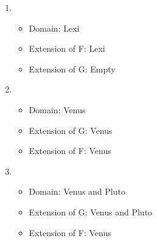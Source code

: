 \begin{enumerate}
\begin{enumerate}
	\item {}

	 \opts{

	  \dotline
	  \dotline
	  \dotline
	  \dotline
	  \dotline

	 }
	 {

	\begin{itemize}

	 \item Domain: Lexi

	 \item Extension of F: Lexi

	 \item Extension of G: Empty

	\end{itemize}

	 }



	\item {}

	 \opts{

	  \dotline
	  \dotline
	  \dotline
	  \dotline
	  \dotline

	 }
	 {

	  \begin{itemize}

	   \item Domain: Venus

	   \item Extension of G: Venus

	   \item Extension of F: Venus

   \end{itemize}

  }



	\item {}

	 \opts{

	  \dotline
	  \dotline
	  \dotline
	  \dotline
	  \dotline

	 }
	 {
	  \begin{itemize}

	   \item Domain: Venus and Pluto

	  \item Extension of G: Venus and Pluto

	 \item Extension of F: Venus

   \end{itemize}}


\end{enumerate}
\end{enumerate}
